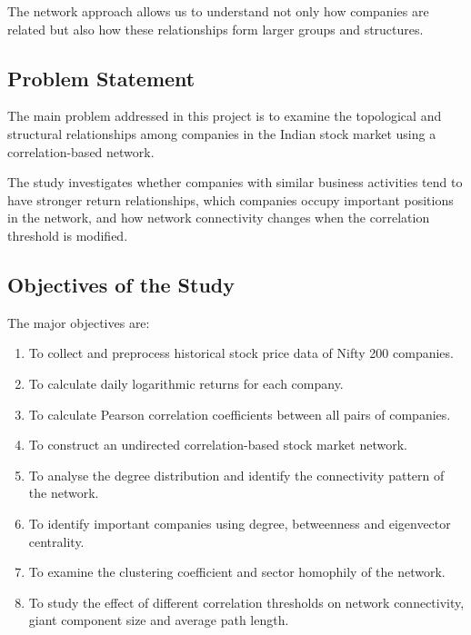 \documentclass[11pt,a4paper]{article}
\begin{document}
The network approach allows us to understand not only how
companies are related but also how these relationships form
larger groups and structures.

\subsection{Problem Statement}

The main problem addressed in this project is to examine the
topological and structural relationships among companies in the
Indian stock market using a correlation-based network.

The study investigates whether companies with similar business
activities tend to have stronger return relationships, which
companies occupy important positions in the network, and how
network connectivity changes when the correlation threshold
is modified.

\subsection{Objectives of the Study}

The major objectives are:

\begin{enumerate}
    \item To collect and preprocess historical stock price data
    of Nifty 200 companies.

    \item To calculate daily logarithmic returns for each company.

    \item To calculate Pearson correlation coefficients between
    all pairs of companies.

    \item To construct an undirected correlation-based stock
    market network.

    \item To analyse the degree distribution and identify the
    connectivity pattern of the network.

    \item To identify important companies using degree,
    betweenness and eigenvector centrality.

    \item To examine the clustering coefficient and sector
    homophily of the network.

    \item To study the effect of different correlation thresholds
    on network connectivity, giant component size and average
    path length.
\end{enumerate}
\end{document}
